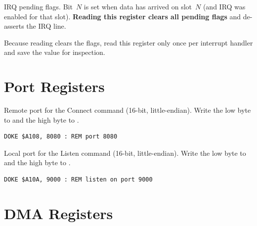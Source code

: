 

IRQ pending flags.  Bit~$N$ is set when data has arrived on slot~$N$ (and IRQ
was enabled for that slot).  \textbf{Reading this register clears all pending
flags} and de-asserts the IRQ line.


\begin{warningbox}
Because reading clears the flags, read this register only once per interrupt
handler and save the value for inspection.
\end{warningbox}


\section{Port Registers}
\label{sec:nic-ports}



Remote port for the Connect command (16-bit, little-endian).  Write the low
byte to  and the high byte to .

\begin{lstlisting}
DOKE $A108, 8080 : REM port 8080
\end{lstlisting}



Local port for the Listen command (16-bit, little-endian).  Write the low byte
to  and the high byte to .

\begin{lstlisting}
DOKE $A10A, 9000 : REM listen on port 9000
\end{lstlisting}


\section{DMA Registers}
\label{sec:nic-dma}

